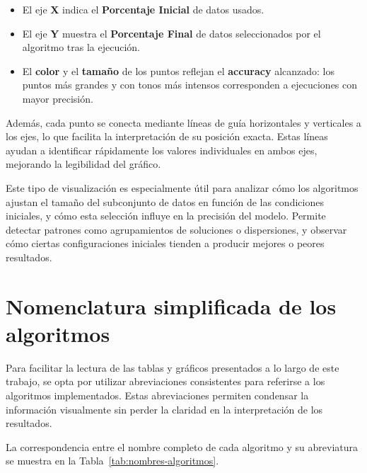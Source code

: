 \begin{itemize}
    \item El eje \textbf{X} indica el \textbf{Porcentaje Inicial} de datos usados.
    \item El eje \textbf{Y} muestra el \textbf{Porcentaje Final} de datos seleccionados por el algoritmo tras la ejecución.
    \item El \textbf{color} y el \textbf{tamaño} de los puntos reflejan el \textbf{accuracy} alcanzado: los puntos más grandes
          y con tonos más intensos corresponden a ejecuciones con mayor precisión.
\end{itemize}

Además, cada punto se conecta mediante líneas de guía horizontales y verticales a los ejes, lo que facilita la interpretación de su posición exacta.
Estas líneas ayudan a identificar rápidamente los valores individuales en ambos ejes, mejorando la legibilidad del gráfico.

Este tipo de visualización es especialmente útil para analizar cómo los algoritmos ajustan el tamaño del subconjunto de datos en función de las condiciones iniciales,
y cómo esta selección influye en la precisión del modelo.
Permite detectar patrones como agrupamientos de soluciones o dispersiones, y observar cómo ciertas configuraciones iniciales tienden a producir mejores o peores resultados.


\section{Nomenclatura simplificada de los algoritmos}\label{subsec:nomenclatura-algoritmos}
Para facilitar la lectura de las tablas y gráficos presentados a lo largo de este trabajo,
se opta por utilizar abreviaciones consistentes para referirse a los algoritmos implementados.
Estas abreviaciones permiten condensar la información visualmente sin perder la claridad en la interpretación de los resultados.

La correspondencia entre el nombre completo de cada algoritmo y su abreviatura se muestra en la Tabla~\ref{tab:nombres-algoritmos}.

